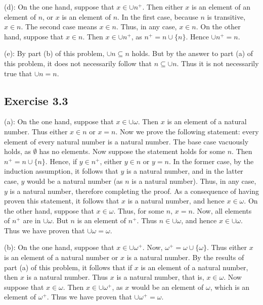 \documentclass{article}
\theoremstyle{definition}
\begin{document}
(d): On the one hand, suppose that $x\in\cup n^+$. Then either $x$ is an element of an element of $n$, or $x$ is an element of $n$. In the first case, because $n$ is transitive, 
$x\in n$. The second case means $x\in n$. Thus, in any case, $x\in n$. On the other hand, suppose that $x\in n$. Then $x\in\cup n^+$, as $n^+=n\cup\{n\}$. Hence $\cup n^+=n$.


(e): By part (b) of this problem, $\cup n\subseteq n$ holds. But by the answer to part (a) of this problem, it does not necessarily follow that $n\subseteq\cup n$. Thus it is not necessarily true 
that $\cup n=n$.

\subsection*{Exercise 3.3}
(a): On the one hand, suppose that $x\in\cup\omega$. Then $x$ is an element of a natural number. 
Thus either $x\in n$ or $x=n$. Now we prove the following statement: every element of every natural number is a natural number. The base case vacuously 
holds, as $\emptyset$ has no elements. Now suppose the statement holds for some $n$. Then $n^+=n\cup\{n\}$. Hence, if $y\in n^+$, either $y\in n$ or $y=n$. In the former case, by the induction 
assumption, it follows that $y$ is a natural number, and in the latter case, $y$ would be a natural number (as $n$ is a natural number). Thus, in any case, $y$ is a natural number, therefore 
completing the proof. As a consequence of having proven this statement, it follows that $x$ is a natural number, and hence $x\in\omega$. On the other hand, suppose that $x\in\omega$. Thus, for 
some $n$, $x=n$. Now, all elements of $n^+$ are in $\cup\omega$. But $n$ is an element of $n^+$. Thus $n\in\cup\omega$, and hence $x\in\cup\omega$. Thus we have proven that $\cup\omega=\omega$. 


(b): On the one hand, suppose that $x\in\cup\omega^+$. Now, $\omega^+=\omega\cup\{\omega\}$. Thus either $x$ is an element of a natural number or $x$ is a natural number. By the results of 
part (a) of this problem, it follows that if $x$ is an element of a natural number, then $x$ is a natural number. Thus $x$ is a natural number, that is, $x\in\omega$. Now suppose that
$x\in\omega$. Then $x\in\cup\omega^+$, as $x$ would be an element of $\omega$, which is an element of $\omega^+$. Thus we have proven that $\cup\omega^+=\omega$.
\end{document}
